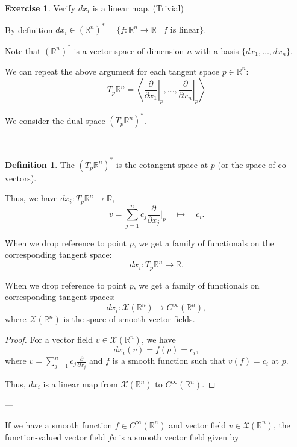 \documentclass[11pt]{article}
\theoremstyle{definition}
\newtheorem{definition}{Definition}[section]
\newtheorem{exercise}{Exercise}
\theoremstyle{remark}
\begin{document}
\begin{exercise}
Verify $d x_i$ is a linear map. (Trivial)
\end{exercise}

By definition $d x_i \in (\mathbb{R}^n)^* = \{ f : \mathbb{R}^n \to \mathbb{R} \mid f \text{ is linear} \}$.

Note that $(\mathbb{R}^n)^*$ is a vector space of dimension $n$ with a basis $\{ d x_1, \dots, d x_n \}$.

We can repeat the above argument for each tangent space $p \in \mathbb{R}^n$:
\[
T_p \mathbb{R}^n = \left\langle \left. \frac{\partial}{\partial x_1} \right|_p, \dots, \left. \frac{\partial}{\partial x_n} \right|_p \right\rangle
\]

We consider the dual space $(T_p \mathbb{R}^n)^*$.

---

\begin{definition}\label{def:cotangent_space}
The $(T_p \mathbb{R}^n)^*$ is the \underline{cotangent space} at $p$ (or the space of co-vectors).
\end{definition}

Thus, we have $dx_i \colon T_p \mathbb{R}^n \to \mathbb{R}$,
\[
v = \sum_{j=1}^n c_j \frac{\partial}{\partial x_j} \bigg\vert_p \quad \longmapsto \quad c_i.
\]

When we drop reference to point $p$, we get a family of functionals on the corresponding tangent space:
\[
dx_i \colon T_p \mathbb{R}^n \to \mathbb{R}.
\]

When we drop reference to point $p$, we get a family of functionals on corresponding tangent spaces:
\[
dx_i \colon \mathcal{X}(\mathbb{R}^n) \to C^\infty(\mathbb{R}^n),
\]
where $\mathcal{X}(\mathbb{R}^n)$ is the space of smooth vector fields.

\begin{proof}
For a vector field $v \in \mathcal{X}(\mathbb{R}^n)$, we have
\[
dx_i(v) = f(p) = c_i,
\]
where $v = \sum_{j=1}^n c_j \frac{\partial}{\partial x_j}$ and $f$ is a smooth function such that $v(f) = c_i$ at $p$.

Thus, $dx_i$ is a linear map from $\mathcal{X}(\mathbb{R}^n)$ to $C^\infty(\mathbb{R}^n)$.
\end{proof}

---

If we have a smooth function \( f \in C^\infty(\mathbb{R}^n) \) and vector field \( v \in \mathfrak{X}(\mathbb{R}^n) \), the function-valued vector field \( f v \) is a smooth vector field given by
\end{document}
